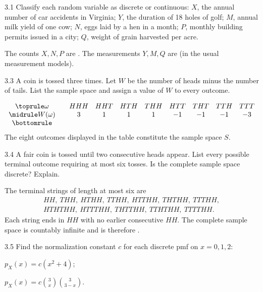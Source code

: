\documentclass[11pt,oneside]{article}
\begin{document}
\begin{exercise}{3.1}
Classify each random variable as discrete or continuous: $X$, the annual number of car accidents in Virginia; $Y$, the duration of 18 holes of golf; $M$, annual milk yield of one cow; $N$, eggs laid by a hen in a month; $P$, monthly building permits issued in a city; $Q$, weight of grain harvested per acre.
\end{exercise}

\begin{solution}
The counts $X,N,P$ are . The measurements $Y,M,Q$ are  (in the usual measurement models).
\end{solution}

\begin{exercise}{3.3}
A coin is tossed three times. Let $W$ be the number of heads minus the number of tails. List the sample space and assign a value of $W$ to every outcome.
\end{exercise}

\begin{solution}
\[
\begin{array}{c@{\qquad}cccccccc}\toprule
\omega&HHH&HHT&HTH&THH&HTT&THT&TTH&TTT\\\midrule
W(\omega)&3&1&1&1&-1&-1&-1&-3\\\bottomrule
\end{array}
\]
The eight outcomes displayed in the table constitute the sample space $S$.
\end{solution}

\begin{exercise}{3.4}
A fair coin is tossed until two consecutive heads appear. List every possible terminal outcome requiring at most six tosses. Is the complete sample space discrete? Explain.
\end{exercise}

\begin{solution}
The terminal strings of length at most six are
\[
\begin{gathered}
HH,\ THH,\ HTHH,\ TTHH,\ HTTHH,\ THTHH,\ TTTHH,\\
HTHTHH,\ HTTTHH,\ THTTHH,\ TTHTHH,\ TTTTHH.
\end{gathered}
\]
Each string ends in $HH$ with no earlier consecutive $HH$. The complete sample space is countably infinite and is therefore .
\end{solution}

\begin{exercise}{3.5}
Find the normalization constant $c$ for each discrete pmf on $x=0,1,2$:
\par
\begin{exercisesubparts}
\item $p_X(x)=c(x^2+4)$;
\item $\displaystyle p_X(x)=c\binom{3}{x}\binom{3}{3-x}$. 
\end{exercisesubparts}
\end{exercise}
\end{document}
